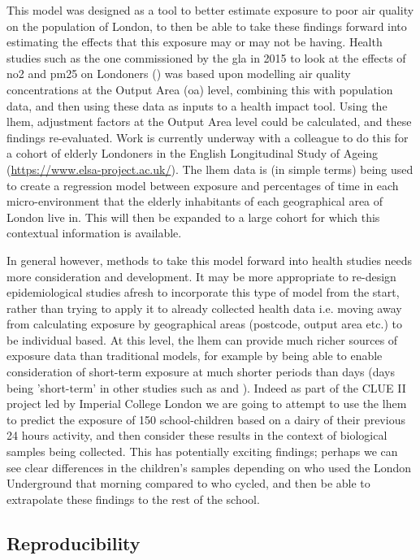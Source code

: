 This model was designed as a tool to better estimate exposure to poor air quality on the population of London, to then be able to take these findings forward into estimating the effects that this exposure may or may not be having. Health studies such as the one commissioned by the \gls{gla} in 2015 to look at the effects of \gls{no2} and \gls{pm25} on Londoners (\cite{walton2015understanding}) was based upon modelling air quality concentrations at the Output Area (\gls{oa}) level, combining this with population data, and then using these data as inputs to a health impact tool. Using the \gls{lhem}, adjustment factors at the Output Area level could be calculated, and these findings re-evaluated. Work is currently underway with a colleague to do this for a cohort of elderly Londoners in the English Longitudinal Study of Ageing (\url{https://www.elsa-project.ac.uk/}). The \gls{lhem} data is (in simple terms) being used to create a regression model between exposure and percentages of time in each micro-environment that the elderly inhabitants of each geographical area of London live in. This will then be expanded to a large cohort for which this contextual information is available.

In general however, methods to take this model forward into health studies needs more consideration and development. It may be more appropriate to re-design epidemiological studies afresh to incorporate this type of model from the start, rather than trying to apply it to already collected health data i.e. moving away from calculating exposure by geographical areas (postcode, output area etc.) to be individual based. At this level, the \gls{lhem} can provide much richer sources of exposure data than traditional models, for example by being able to enable consideration of short-term exposure at much shorter periods than days (days being 'short-term' in other studies such as \cite{Kloog2012} and \cite{Beverland2012}). Indeed as part of the CLUE II project led by Imperial College London we are going to attempt to use the \gls{lhem} to predict the exposure of 150 school-children based on a dairy of their previous 24 hours activity, and then consider these results in the context of biological samples being collected. This has potentially exciting findings; perhaps we can see clear differences in the children's samples depending on who used the London Underground that morning compared to who cycled, and then be able to extrapolate these findings to the rest of the school.

\subsection{Reproducibility}
\label{subsec:data_reproducibility}

